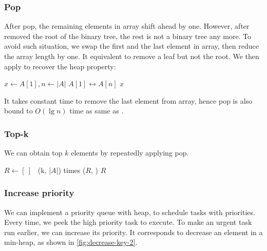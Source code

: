 \documentclass[b5paper]{article}
\begin{document}
\subsubsection{Pop}

After pop, the remaining elements in array shift ahead by one. However, after removed the root of the binary tree, the rest is not a binary tree any more. To avoid such situation, we swap the first and the last element in array, then reduce the array length by one. It equivalent to remove a leaf but not the root. We then apply  to recover the heap property:

\begin{algorithmic}[1]
  \State $x \gets A [1], n \gets |A|$
  \State {} $A[1] \leftrightarrow A[n]$
  \State {}
    \State {}
  \EndIf
  \State \Return $x$
\EndFunction
\end{algorithmic}

It takes constant time to remove the last element from array, hence pop is also bound to $O(\lg n)$ time as same as .

\subsubsection{Top-k}

We can obtain top $k$ elements by repeatedly applying pop.

\begin{algorithmic}[1]
  \State $R \gets [\ ]$
  \State {}
  \Loop \ (k, |$A$|) times 
    \State {}($R$, )
  \EndLoop
  \State \Return $R$
\EndFunction
\end{algorithmic}

\subsubsection{Increase priority}

We can implement a priority queue with heap, to schedule tasks with priorities. Every time, we peek the high priority task to execute. To make an urgent task run earlier, we can increase its priority. It corresponds to decrease an element in a min-heap, as shown in \cref{fig:decrease-key-2}.
\end{document}
